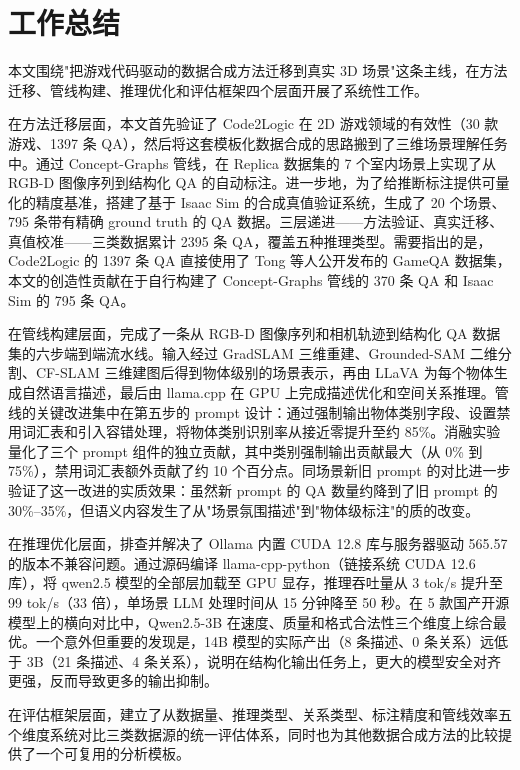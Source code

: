 
\section{工作总结}

本文围绕"把游戏代码驱动的数据合成方法迁移到真实 3D 场景"这条主线，在方法迁移、管线构建、推理优化和评估框架四个层面开展了系统性工作。

在方法迁移层面，本文首先验证了 Code2Logic 在 2D 游戏领域的有效性（30 款游戏、1397 条 QA），然后将这套模板化数据合成的思路搬到了三维场景理解任务中。通过 Concept-Graphs 管线，在 Replica 数据集的 7 个室内场景上实现了从 RGB-D 图像序列到结构化 QA 的自动标注。进一步地，为了给推断标注提供可量化的精度基准，搭建了基于 Isaac Sim 的合成真值验证系统，生成了 20 个场景、795 条带有精确 ground truth 的 QA 数据。三层递进——方法验证、真实迁移、真值校准——三类数据累计 2395 条 QA，覆盖五种推理类型。需要指出的是，Code2Logic 的 1397 条 QA 直接使用了 Tong 等人公开发布的 GameQA 数据集，本文的创造性贡献在于自行构建了 Concept-Graphs 管线的 370 条 QA 和 Isaac Sim 的 795 条 QA。

在管线构建层面，完成了一条从 RGB-D 图像序列和相机轨迹到结构化 QA 数据集的六步端到端流水线。输入经过 GradSLAM 三维重建、Grounded-SAM 二维分割、CF-SLAM 三维建图后得到物体级别的场景表示，再由 LLaVA 为每个物体生成自然语言描述，最后由 llama.cpp 在 GPU 上完成描述优化和空间关系推理。管线的关键改进集中在第五步的 prompt 设计：通过强制输出物体类别字段、设置禁用词汇表和引入容错处理，将物体类别识别率从接近零提升至约 85\%。消融实验量化了三个 prompt 组件的独立贡献，其中类别强制输出贡献最大（从 0\% 到 75\%），禁用词汇表额外贡献了约 10 个百分点。同场景新旧 prompt 的对比进一步验证了这一改进的实质效果：虽然新 prompt 的 QA 数量约降到了旧 prompt 的 30\%--35\%，但语义内容发生了从"场景氛围描述"到"物体级标注"的质的改变。

在推理优化层面，排查并解决了 Ollama 内置 CUDA 12.8 库与服务器驱动 565.57 的版本不兼容问题。通过源码编译 llama-cpp-python（链接系统 CUDA 12.6 库），将 qwen2.5 模型的全部层加载至 GPU 显存，推理吞吐量从 3 tok/s 提升至 99 tok/s（33 倍），单场景 LLM 处理时间从 15 分钟降至 50 秒。在 5 款国产开源模型上的横向对比中，Qwen2.5-3B 在速度、质量和格式合法性三个维度上综合最优。一个意外但重要的发现是，14B 模型的实际产出（8 条描述、0 条关系）远低于 3B（21 条描述、4 条关系），说明在结构化输出任务上，更大的模型安全对齐更强，反而导致更多的输出抑制。

在评估框架层面，建立了从数据量、推理类型、关系类型、标注精度和管线效率五个维度系统对比三类数据源的统一评估体系，同时也为其他数据合成方法的比较提供了一个可复用的分析模板。

